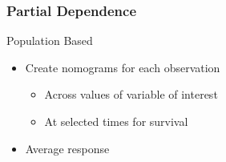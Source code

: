 \documentclass[xcolor=svgnames]{beamer}\usepackage[]{graphicx}\usepackage[]{color}
\begin{document}
\begin{frame}
\frametitle{Partial Dependence}

Population Based

\begin{itemize}
\item  Create nomograms for each observation
\begin{itemize}
\item  Across values of variable of interest
    \item At selected times for survival
\end{itemize}
  \item Average response
\end{itemize}
\end{frame}
\end{document}
